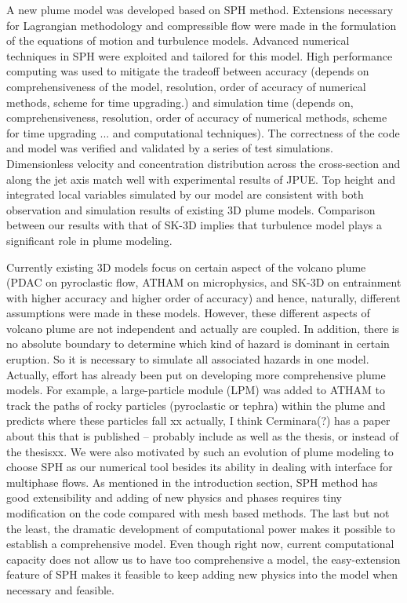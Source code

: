 \documentclass[journal abbreviation, manuscript]{copernicus}
\begin{document}
\conclusions  \label{sec:conclusion}%
A new plume model was developed based on SPH method. Extensions necessary for Lagrangian methodology and compressible flow were made in the formulation of the equations of motion and turbulence models. Advanced numerical techniques in SPH were exploited and tailored for this model. High performance computing was used to mitigate the tradeoff between accuracy (depends on comprehensiveness of the model, resolution, order of accuracy of numerical methods, scheme for time upgrading.) and simulation time (depends on, comprehensiveness, resolution, order of accuracy of numerical methods, scheme for time upgrading ... and computational techniques). The correctness of the code and model was verified and validated by a series of test simulations. Dimensionless velocity and concentration distribution across the cross-section and along the jet axis match well with experimental results of JPUE. Top height and integrated local variables simulated by our model are consistent with both observation and simulation results of existing 3D plume models. Comparison between our results with that of SK-3D implies that turbulence model plays a significant role in plume modeling.

Currently existing 3D models focus on certain aspect of the volcano plume (PDAC on pyroclastic flow, ATHAM on microphysics, and SK-3D on entrainment with higher accuracy and higher order of accuracy) and hence, naturally, different assumptions were made in these models. However, these different aspects of volcano plume are not independent and actually are coupled. In addition, there is no absolute boundary to determine which kind of hazard is dominant in certain eruption. So it is necessary to simulate all associated hazards in one model. Actually, effort has already been put on developing more comprehensive plume models. For example, a large-particle module (LPM) was added to ATHAM to track the paths of rocky particles (pyroclastic or tephra) within the plume and predicts where these particles fall \citep{kobs2009modeling}xx actually, I think Cerminara(?) has a paper about this that is published -- probably include as well as the thesis, or instead of the thesisxx. We were also motivated by such an evolution of plume modeling to choose SPH as our numerical tool besides its ability in dealing with interface for multiphase flows. As mentioned in the introduction section, SPH method has good extensibility and adding of new physics and phases requires tiny modification on the code compared with mesh based methods. The last but not the least, the dramatic development of computational power makes it possible to establish a comprehensive model. Even though right now, current computational capacity does not allow us to have too comprehensive a model, the easy-extension feature of SPH makes it feasible to keep adding new physics into the model when necessary and feasible. 
\end{document}
